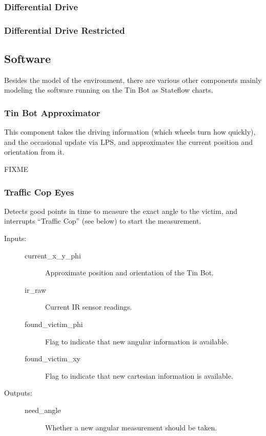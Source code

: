 \documentclass[a4paper,parskip,headheight=38pt]{scrartcl} %
\begin{document}
\subsubsection{Differential Drive}
\subsubsection{Differential Drive Restricted}

\subsection{Software}
Besides the model of the environment, there are various other components mainly modeling the software running on the Tin Bot as Stateflow charts.

\subsubsection{Tin Bot Approximator}

This component takes the driving information (which wheels turn how
quickly), and the occasional update via LPS, and approximates the
current position and orientation from it.

FIXME

\subsubsection{Traffic Cop Eyes}

Detects good points in time to measure the exact angle to the victim,
and interrupts \enquote{Traffic Cop} (see below) to start the
measurement.

\begin{description}
\item[Inputs:] \hfill
	\begin{description}
	\item[current\_x\_y\_phi] Approximate position and orientation of the Tin Bot. 
	\item[ir\_raw] Current IR sensor readings.
	\item[found\_victim\_phi] Flag to indicate that new angular information is available.
	\item[found\_victim\_xy] Flag to indicate that new cartesian information is available.
	\end{description}
\item[Outputs:] \hfill
	\begin{description}
	\item[need\_angle] Whether a new angular measurement should be taken.
	\end{description}
\end{description}
\end{document}
